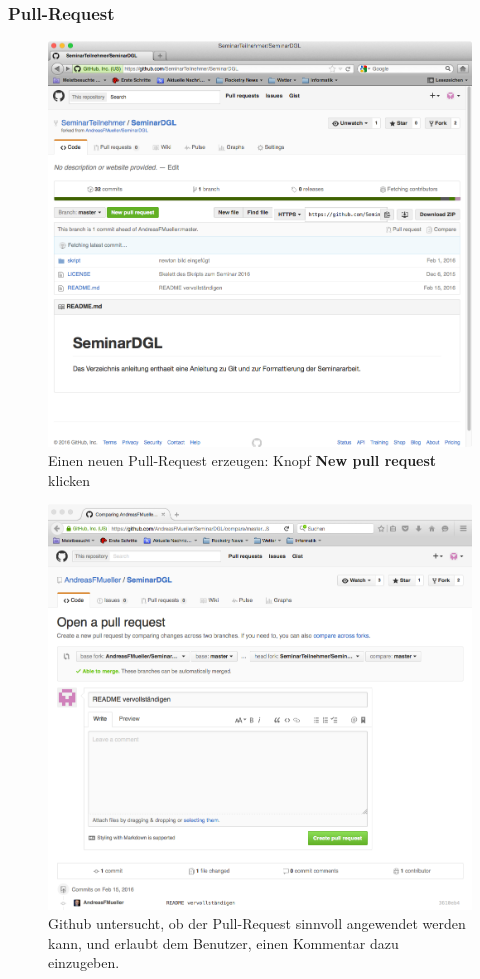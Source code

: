\documentclass[a4paper,12pt]{article}
\begin{document}
\subsubsection{Pull-Request}
\begin{figure}
\centering
\includegraphics[width=\hsize]{newpullreqest.png}
\caption{Einen neuen Pull-Request erzeugen: Knopf {\bf New pull request}
klicken
\label{newpullrequest}}
\end{figure}
\begin{figure}
\centering
\includegraphics[width=\hsize]{openpull.png}
\caption{Github untersucht, ob der Pull-Request sinnvoll angewendet
werden kann, und erlaubt dem Benutzer, einen Kommentar dazu einzugeben.
\label{openpull}}
\end{figure}
\end{document}
